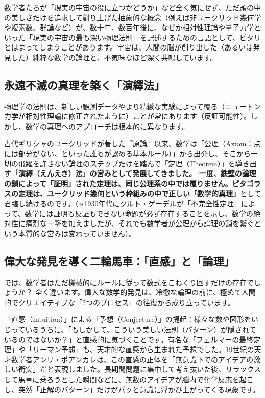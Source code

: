数学者たちが「現実の宇宙の役に立つかどうか」など全く気にせず、ただ頭の中の美しさだけを追求して創り上げた抽象的な概念（例えば非ユークリッド幾何学や複素数、群論など）が、数十年、数百年後に、なぜか相対性理論や量子力学といった「現実の宇宙の最も深い物理法則」を記述するための言語として、ピタリとはまってしまうことがあります。宇宙は、人間の脳が創り出した（あるいは発見した）純粋な数学の論理と、不気味なほど深く共鳴しています。

\subsection{永遠不滅の真理を築く「演繹法」}

物理学の法則は、新しい観測データやより精緻な実験によって覆る（ニュートン力学が相対性理論に修正されたように）ことが常にあります（反証可能性）。しかし、数学の真理へのアプローチは根本的に異なります。

古代ギリシャのユークリッドが著した『原論』以来、数学は「公理（Axiom：点には部分がない、といった誰もが認める基本ルール）」から出発し、そこから一切の飛躍を許さない論理のステップだけを踏んで「定理（Theorem）」を導き出す\textbf{「演繹（えんえき）法」の営みとして発展してきました。 一度、鉄壁の論理の鎖によって「証明」された定理は、同じ公理系の中では覆りません。ピタゴラスの定理は、ユークリッド幾何という枠組みの中で正しい「数学的真理」}として君臨し続けるのです。（※1930年代にクルト・ゲーデルが「不完全性定理」によって、数学には証明も反証もできない命題が必ず存在することを示し、数学の絶対性に痛烈な一撃を加えましたが、それでも数学者が公理から論理の鎖を繋ぐという本質的な営みは変わっていません）。

\subsection{偉大な発見を導く二輪馬車：「直感」と「論理」}

では、数学者はただ機械的にルールに従って数式をこねくり回すだけの存在でしょうか？ 全く違います。偉大な数学的発見は、冷徹な論理の前に、極めて人間的でクリエイティブな「2つのプロセス」の往復から成り立っています。

「直感（Intuition）」による「予想（Conjecture）」の提起：様々な数や図形をいじっているうちに、「もしかして、こういう美しい法則（パターン）が隠されているのではないか？」と直感的に気づくことです。有名な「フェルマーの最終定理」や「リーマン予想」も、天才的な直感から生まれた予想でした。19世紀の天才数学者アンリ・ポアンカレは、この直感の正体を「無意識下でのアイデアの激しい衝突」だと表現しました。長期間問題に集中して考え抜いた後、リラックスして馬車に乗ろうとした瞬間などに、無数のアイデアが脳内で化学反応を起こし、突然「正解のパターン」だけがパッと意識に浮かび上がってくる現象です。

